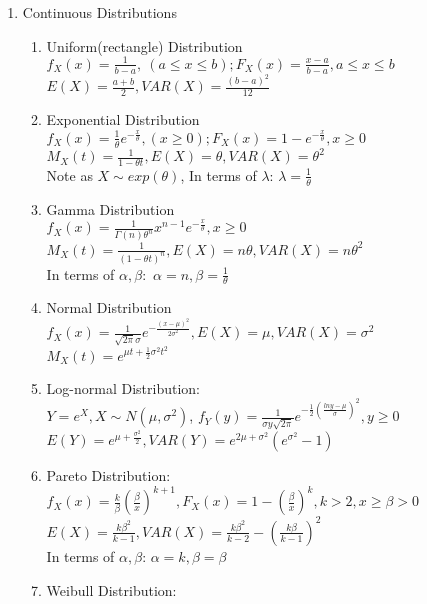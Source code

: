 \documentclass[10pt]{article}
\begin{document}
\begin{multicols}{2}
\begin{enumerate}
			\item Continuous Distributions
			\begin{enumerate}
				\item Uniform(rectangle) Distribution\\
				$f_X(x) = \frac{1}{b-a},  \  (a \le x \le b); F_X(x) = \frac{x-a}{b-a}, a\le x \le b$\\
				$E(X) = \frac{a+b}{2}, VAR(X) = \frac{(b-a)^2}{12}$
				\item Exponential Distribution\\
				$f_X(x) = \frac{1}{\theta}e^{-\frac{x}{\theta}}, (x \ge 0); F_X(x) = 1- e^{-\frac{x}{\theta}}, x \ge 0$\\
				$M_X(t) = \frac{1}{1-\theta t}, E(X) = \theta, VAR(X) = \theta^2$\\
				Note as $X \sim exp(\theta)$, In terms of $\lambda$: $\lambda = \frac{1}{\theta}$
				\item Gamma Distribution\\
				$f_X(x)= \frac{1}{\Gamma(n)\theta^n}x^{n-1}e^{-\frac{x}{\theta}}, x \ge 0$\\
				$M_X(t) = \frac{1}{(1-\theta t)^n}, E(X) = n\theta, VAR(X) = n\theta^2$\\
				In terms of $\alpha, \beta:$ $\alpha = n, \beta = \frac{1}{\theta}$
				\item Normal Distribution\\
				$f_X(x) = \frac{1}{\sqrt{2\pi}\sigma} e^{-\frac{(x-\mu)^2}{2\sigma^2}}, E(X) = \mu, VAR(X) = \sigma^2$\\
				$M_X(t) = e^{\mu t + \frac{1}{2}\sigma^2 t^2}$
				\item Log-normal Distribution:\\
				$Y = e^X, X \sim N(\mu, \sigma^2)$, 
				$f_Y(y) = \frac{1}{\sigma y \sqrt{2 \pi}}e^{-\frac{1}{2}(\frac{lny - \mu}{\sigma})^2}, y \ge 0$\\
				$E(Y) = e^{\mu+\frac{\sigma^2}{2}}, VAR(Y) = e^{2\mu + \sigma^2}(e^{\sigma^2} - 1)$
				\item Pareto Distribution:\\
				$f_X(x) = \frac{k}{\beta}(\frac{\beta}{x})^{k+1}, F_X(x) = 1 - (\frac{\beta}{x})^k, k > 2, x \ge \beta >0$\\
				$E(X) = \frac{k\beta^2}{k-1}, VAR(X) = \frac{k\beta^2}{k-2} - (\frac{k\beta}{k-1})^2$\\
				In terms of $\alpha, \beta$: $\alpha = k, \beta = \beta$
				\item Weibull Distribution:\\

\end{enumerate}
\end{enumerate}
\end{multicols}
\end{document}
